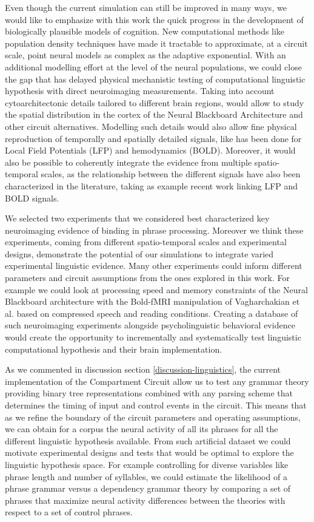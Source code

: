 \documentclass[10pt]{article}
\begin{document}
Even though the current simulation can still be improved in many ways, we would like to emphasize with this work the quick progress in the development of biologically plausible models of cognition.
New computational methods like population density techniques have made it tractable to approximate, at a circuit scale, point neural models as complex as the adaptive exponential.
With an additional modelling effort at the level of the neural populations, we could close the gap that has delayed physical mechanistic testing of computational linguistic hypothesis with direct neuroimaging measurements.
Taking into account cytoarchitectonic details tailored to different brain regions, would allow to study the spatial distribution in the cortex of the Neural Blackboard Architecture and other circuit alternatives.
Modelling such details would also allow fine physical reproduction of temporally and spatially detailed signals, like has been done for Local Field Potentials (LFP)\cite{Mazzoni_2015,Hagen_2015} and hemodynamics (BOLD)\cite{Buxton_2004}.
Moreover, it would also be possible to coherently integrate the evidence from multiple spatio-temporal scales, as the relationship between the different signals have also been characterized in the literature, taking as example recent work linking LFP and BOLD signals\cite{hermes2017neuronal}.

We selected two experiments that we considered best characterized key neuroimaging evidence of binding in phrase processing.
Moreover we think these experiments, coming from different spatio-temporal scales and experimental designs, demonstrate the potential of our simulations to integrate varied experimental linguistic evidence.
Many other experiments could inform different parameters and circuit assumptions from the ones explored in this work.
For example we could look at processing speed and memory constraints of the Neural Blackboard architecture with the Bold-fMRI manipulation of Vagharchakian et al.\cite{Vagharchakian_2012} based on compressed speech and reading conditions.
Creating a database of such neuroimaging experiments alongside psycholinguistic behavioral evidence would create the opportunity to incrementally and systematically test linguistic computational hypothesis and their brain implementation.

As we commented in discussion section \ref{discussion-linguistics}, the current implementation of the Compartment Circuit allow us to test any grammar theory providing binary tree representations combined with any parsing scheme that determines the timing of input and control events in the circuit.
This means that as we refine the boundary of the circuit parameters and operating assumptions, we can obtain for a corpus the neural activity of all its phrases for all the different linguistic hypothesis available.
From such artificial dataset we could motivate experimental designs and tests that would be optimal to explore the linguistic hypothesis space.
For example controlling for diverse variables like phrase length and number of syllables, we could estimate the likelihood of a phrase grammar versus a dependency grammar theory by comparing a set of phrases that maximize neural activity differences between the theories with respect to a set of control phrases.
\end{document}
